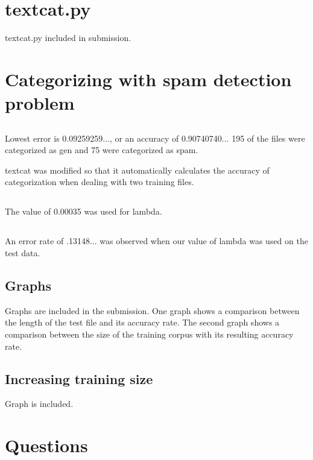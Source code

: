 \documentclass[12pt, letterpaper]{article}
\begin{document}
\section{textcat.py}

textcat.py included in submission.

\section{Categorizing with spam detection problem}

\subsection{}

Lowest error is 0.09259259..., or an accuracy of 0.90740740...
195 of the files were categorized as gen and 75 were categorized as spam.

textcat was modified so that it automatically calculates the accuracy of categorization when dealing with two training files. 

\subsection{}

The value of 0.00035 was used for lambda.

\subsection{}

An error rate of .13148... was observed when our value of lambda was used on the test data.

\subsection{Graphs}
Graphs are included in the submission. 
One graph shows a comparison between the length of the test file and its accuracy rate. The second graph shows a comparison between the size of the training corpus with its resulting accuracy rate.

\subsection{Increasing training size}
Graph is included. 

\section{Questions}
\end{document}
